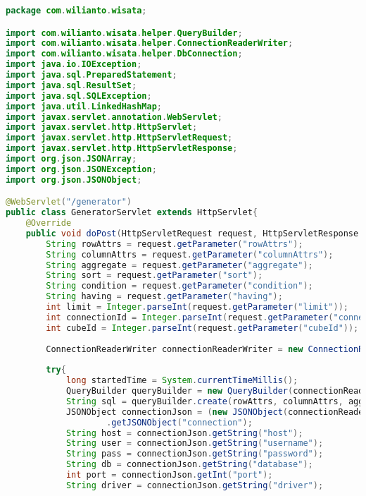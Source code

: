 \begin{lstlisting}[language=Java,basicstyle=\tiny,caption=GeneratorServlet.java]
package com.wilianto.wisata;

import com.wilianto.wisata.helper.QueryBuilder;
import com.wilianto.wisata.helper.ConnectionReaderWriter;
import com.wilianto.wisata.helper.DbConnection;
import java.io.IOException;
import java.sql.PreparedStatement;
import java.sql.ResultSet;
import java.sql.SQLException;
import java.util.LinkedHashMap;
import javax.servlet.annotation.WebServlet;
import javax.servlet.http.HttpServlet;
import javax.servlet.http.HttpServletRequest;
import javax.servlet.http.HttpServletResponse;
import org.json.JSONArray;
import org.json.JSONException;
import org.json.JSONObject;

@WebServlet("/generator")
public class GeneratorServlet extends HttpServlet{
    @Override
    public void doPost(HttpServletRequest request, HttpServletResponse response) throws IOException{
        String rowAttrs = request.getParameter("rowAttrs");
        String columnAttrs = request.getParameter("columnAttrs");
        String aggregate = request.getParameter("aggregate");
        String sort = request.getParameter("sort");
        String condition = request.getParameter("condition");
        String having = request.getParameter("having");
        int limit = Integer.parseInt(request.getParameter("limit"));
        int connectionId = Integer.parseInt(request.getParameter("connectionId"));
        int cubeId = Integer.parseInt(request.getParameter("cubeId"));
        
        ConnectionReaderWriter connectionReaderWriter = new ConnectionReaderWriter(getServletContext());
        
        try{
            long startedTime = System.currentTimeMillis();
            QueryBuilder queryBuilder = new QueryBuilder(connectionReaderWriter.getCube(connectionId, cubeId));
            String sql = queryBuilder.create(rowAttrs, columnAttrs, aggregate, condition, sort, limit, having);
            JSONObject connectionJson = (new JSONObject(connectionReaderWriter.getConnection(connectionId)))
                    .getJSONObject("connection");
            String host = connectionJson.getString("host");
            String user = connectionJson.getString("username");
            String pass = connectionJson.getString("password");
            String db = connectionJson.getString("database");
            int port = connectionJson.getInt("port");
            String driver = connectionJson.getString("driver");
            

\end{lstlisting}
